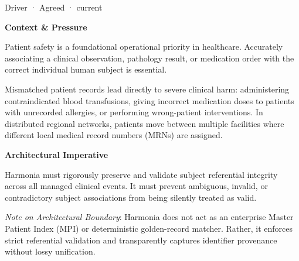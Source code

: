 \label{element:b835c7b1055e4dbc9e1cd3a0c545c1c8}
{\small Driver · Agreed · current}\par

\par\medskip\textbf{Context \& Pressure}\par


Patient safety is a foundational operational priority in healthcare. Accurately associating a clinical observation, pathology result, or medication order with the correct individual human subject is essential.



Mismatched patient records lead directly to severe clinical harm: administering contraindicated blood transfusions, giving incorrect medication doses to patients with unrecorded allergies, or performing wrong-patient interventions. In distributed regional networks, patients move between multiple facilities where different local medical record numbers (MRNs) are assigned.



\par\medskip\textbf{Architectural Imperative}\par


Harmonia must rigorously preserve and validate subject referential integrity across all managed clinical events. It must prevent ambiguous, invalid, or contradictory subject associations from being silently treated as valid.



\emph{Note on Architectural Boundary}: Harmonia does not act as an enterprise Master Patient Index (MPI) or deterministic golden-record matcher. Rather, it enforces strict referential validation and transparently captures identifier provenance without lossy unification.



